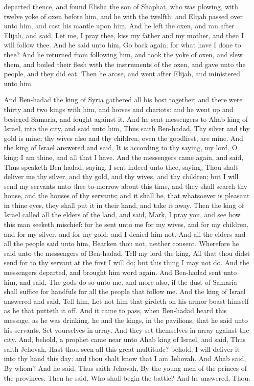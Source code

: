 departed thence, and found Elisha the son of Shaphat, who was plowing, with twelve yoke of oxen before him, and he with the twelfth: and Elijah passed over unto him, and cast his mantle upon him. And he left the oxen, and ran after Elijah, and said, Let me, I pray thee, kiss my father and my mother, and then I will follow thee. And he said unto him, Go back again; for what have I done to thee? And he returned from following him, and took the yoke of oxen, and slew them, and boiled their flesh with the instruments of the oxen, and gave unto the people, and they did eat. Then he arose, and went after Elijah, and ministered unto him. 

And Ben-hadad the king of Syria gathered all his host together; and there were thirty and two kings with him, and horses and chariots: and he went up and besieged Samaria, and fought against it. And he sent messengers to Ahab king of Israel, into the city, and said unto him, Thus saith Ben-hadad, Thy silver and thy gold is mine; thy wives also and thy children, even the goodliest, are mine. And the king of Israel answered and said, It is according to thy saying, my lord, O king; I am thine, and all that I have. And the messengers came again, and said, Thus speaketh Ben-hadad, saying, I sent indeed unto thee, saying, Thou shalt deliver me thy silver, and thy gold, and thy wives, and thy children; but I will send my servants unto thee to-morrow about this time, and they shall search thy house, and the houses of thy servants; and it shall be, that whatsoever is pleasant in thine eyes, they shall put it in their hand, and take it away.  Then the king of Israel called all the elders of the land, and said, Mark, I pray you, and see how this man seeketh mischief: for he sent unto me for my wives, and for my children, and for my silver, and for my gold; and I denied him not. And all the elders and all the people said unto him, Hearken thou not, neither consent. Wherefore he said unto the messengers of Ben-hadad, Tell my lord the king, All that thou didst send for to thy servant at the first I will do; but this thing I may not do. And the messengers departed, and brought him word again. And Ben-hadad sent unto him, and said, The gods do so unto me, and more also, if the dust of Samaria shall suffice for handfuls for all the people that follow me. And the king of Israel answered and said, Tell him, Let not him that girdeth on his armor boast himself as he that putteth it off. And it came to pass, when Ben-hadad heard this message, as he was drinking, he and the kings, in the pavilions, that he said unto his servants, Set yourselves in array. And they set themselves in array against the city.  And, behold, a prophet came near unto Ahab king of Israel, and said, Thus saith Jehovah, Hast thou seen all this great multitude? behold, I will deliver it into thy hand this day; and thou shalt know that I am Jehovah. And Ahab said, By whom? And he said, Thus saith Jehovah, By the young men of the princes of the provinces. Then he said, Who shall begin the battle? And he answered, Thou. 